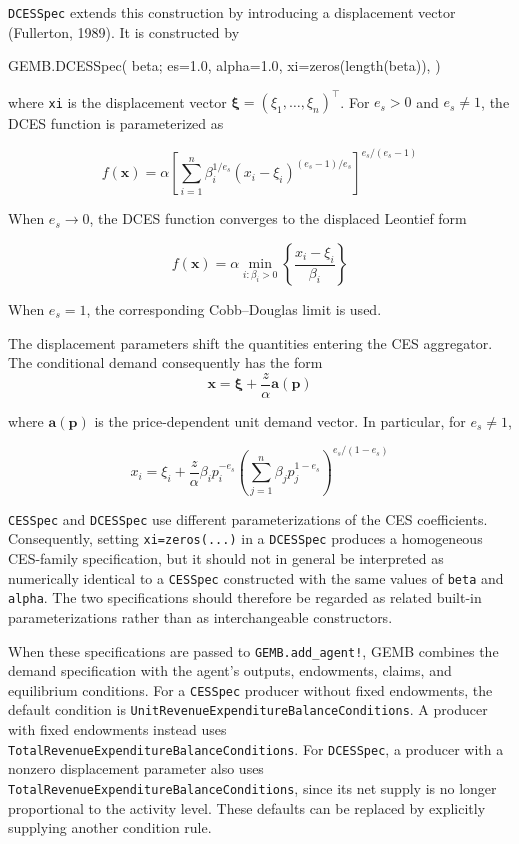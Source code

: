 \documentclass[
  letterpaper,
  DIV=11,
  numbers=noendperiod]{scrreprt}
\newenvironment{Shaded}{\begin{snugshade}}{\end{snugshade}}
\newcommand{\FloatTok}[1]{\textcolor[rgb]{0.68,0.00,0.00}{#1}}
\newcommand{\FunctionTok}[1]{\textcolor[rgb]{0.28,0.35,0.67}{#1}}
\newcommand{\NormalTok}[1]{\textcolor[rgb]{0.00,0.23,0.31}{#1}}
\newcommand{\OperatorTok}[1]{\textcolor[rgb]{0.37,0.37,0.37}{#1}}
\begin{document}
\texttt{DCESSpec} extends this construction by introducing a
displacement vector (Fullerton, 1989). It is constructed by

\begin{Shaded}
\begin{Highlighting}[]
\NormalTok{GEMB.}\FunctionTok{DCESSpec}\NormalTok{(}
\NormalTok{    beta;}
\NormalTok{    es}\OperatorTok{=}\FloatTok{1.0}\NormalTok{,}
\NormalTok{    alpha}\OperatorTok{=}\FloatTok{1.0}\NormalTok{,}
\NormalTok{    xi}\OperatorTok{=}\FunctionTok{zeros}\NormalTok{(}\FunctionTok{length}\NormalTok{(beta)),}
\NormalTok{)}
\end{Highlighting}
\end{Shaded}

where \texttt{xi} is the displacement vector
\(\boldsymbol{\xi}=(\xi_1,\ldots,\xi_n)^\top\). For \(e_s>0\) and
\(e_s\ne1\), the DCES function is parameterized as

\[
f(\mathbf x)
=
\alpha
\left[
\sum_{i=1}^n
\beta_i^{1/e_s}
(x_i-\xi_i)^{(e_s-1)/e_s}
\right]^{e_s/(e_s-1)}
\]

When \(e_s\to0\), the DCES function converges to the displaced Leontief
form

\[
f(\mathbf x)
=
\alpha
\min_{i:\beta_i>0}
\left\{
\frac{x_i-\xi_i}{\beta_i}
\right\}
\]

When \(e_s=1\), the corresponding Cobb--Douglas limit is used.

The displacement parameters shift the quantities entering the CES
aggregator. The conditional demand consequently has the form \[
\mathbf x
=
\boldsymbol{\xi}
+
\frac{z}{\alpha}\mathbf a(\mathbf p)
\]

where \(\mathbf a(\mathbf p)\) is the price-dependent unit demand
vector. In particular, for \(e_s\ne1\),

\[
x_i
=
\xi_i
+
\frac{z}{\alpha}
\beta_i p_i^{-e_s}
\left(
\sum_{j=1}^n
\beta_jp_j^{1-e_s}
\right)^{e_s/(1-e_s)}
\]

\texttt{CESSpec} and \texttt{DCESSpec} use different parameterizations
of the CES coefficients. Consequently, setting \texttt{xi=zeros(...)} in
a \texttt{DCESSpec} produces a homogeneous CES-family specification, but
it should not in general be interpreted as numerically identical to a
\texttt{CESSpec} constructed with the same values of \texttt{beta} and
\texttt{alpha}. The two specifications should therefore be regarded as
related built-in parameterizations rather than as interchangeable
constructors.

When these specifications are passed to \texttt{GEMB.add\_agent!}, GEMB
combines the demand specification with the agent's outputs, endowments,
claims, and equilibrium conditions. For a \texttt{CESSpec} producer
without fixed endowments, the default condition is
\texttt{UnitRevenueExpenditureBalanceConditions}. A producer with fixed
endowments instead uses
\texttt{TotalRevenueExpenditureBalanceConditions}. For
\texttt{DCESSpec}, a producer with a nonzero displacement parameter also
uses \texttt{TotalRevenueExpenditureBalanceConditions}, since its net
supply is no longer proportional to the activity level. These defaults
can be replaced by explicitly supplying another condition rule.
\end{document}
